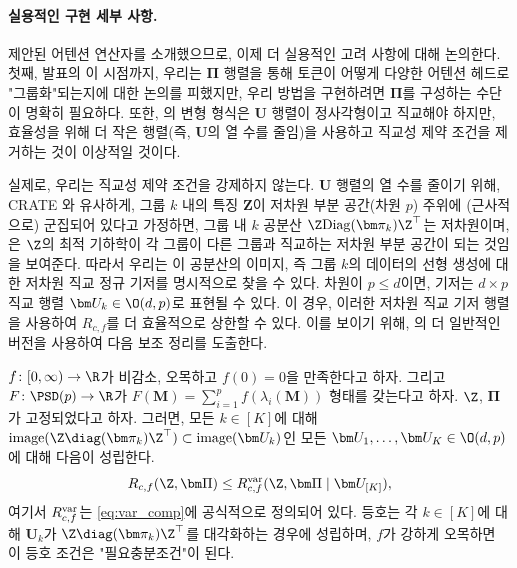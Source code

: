 \documentclass[../../book-main_ko.tex]{subfiles}
\begin{document}
\paragraph{실용적인 구현 세부 사항.} 제안된 어텐션 연산자를 소개했으므로, 이제 더 실용적인 고려 사항에 대해 논의한다. 첫째, 발표의 이 시점까지, 우리는 $\bm\Pi$ 행렬을 통해 토큰이 어떻게 다양한 어텐션 헤드로 "그룹화"되는지에 대한 논의를 피했지만, 우리 방법을 구현하려면 $\bm\Pi$를 구성하는 수단이 명확히 필요하다. 또한, 의 변형 형식은 $\bm U$ 행렬이 정사각형이고 직교해야 하지만, 효율성을 위해 더 작은 행렬(즉, $\bm U$의 열 수를 줄임)을 사용하고 직교성 제약 조건을 제거하는 것이 이상적일 것이다.

실제로, 우리는 직교성 제약 조건을 강제하지 않는다. $\bm U$ 행렬의 열 수를 줄이기 위해, CRATE \citep{yu2023white}와 유사하게, 그룹 \(k\) 내의 특징 $\bm Z$이 저차원 부분 공간(차원 \(p\)) 주위에 (근사적으로) 군집되어 있다고 가정하면, 그룹 내 \(k\) 공분산 \(\Z\mathrm{Diag}(\bm \pi_{k})\Z^{\top}\)는 저차원이며, \cite{yu2020learning}은 $\Z$의 최적 기하학이 각 그룹이 다른 그룹과 직교하는 저차원 부분 공간이 되는 것임을 보여준다. 따라서 우리는 이 공분산의 이미지, 즉 그룹 \(k\)의 데이터의 선형 생성에 대한 저차원 직교 정규 기저를 명시적으로 찾을 수 있다. 차원이 $p \leq d$이면, 기저는 $d\times p$ 직교 행렬 $\bm U_k \in \O(d, p)$로 표현될 수 있다. 이 경우, 이러한 저차원 직교 기저 행렬을 사용하여 \(R_{c,f}\)를 더 효율적으로 상한할 수 있다. 이를 보이기 위해, 의 더 일반적인 버전을 사용하여 다음 보조 정리를 도출한다.
\begin{corollary}\label{cor:var_concave_logdet}
    \(f \colon [0, \infty) \to \R\)가 비감소, 오목하고 \(f(0) = 0\)을 만족한다고 하자. 그리고 \(F \colon \PSD(p) \to \R\)가 \(F(\bm M) = \sum_{i = 1}^{p}f(\lambda_{i}(\bm M))\) 형태를 갖는다고 하자. \(\Z\), \(\bm \Pi\)가 고정되었다고 하자. 그러면, 모든 \(k \in [K]\)에 대해 \(\mathrm{image}(\Z\diag(\bm \pi_{k})\Z^{\top}) \subset \mathrm{image}(\bm U_{k})\)인 모든 \(\bm U_{1}, \dots, \bm U_{K} \in \O(d, p)\)에 대해 다음이 성립한다.
    \begin{equation}
        R_{c, f}(\Z, \bm\Pi) \leq R_{c, f}^{\rm var}(\Z, \bm\Pi \mid \bm U_{[K]}), 
    \end{equation}
     여기서 \(R_{c, f}^{\rm var}\)는 \eqref{eq:var_comp}에 공식적으로 정의되어 있다. 등호는 각 \(k \in [K]\)에 대해 \(\bm U_{k}\)가 \(\Z\diag(\bm \pi_{k})\Z^{\top}\)를 대각화하는 경우에 성립하며, \(f\)가 강하게 오목하면 이 등호 조건은 "필요충분조건"이 된다.
\end{corollary}
\end{document}
